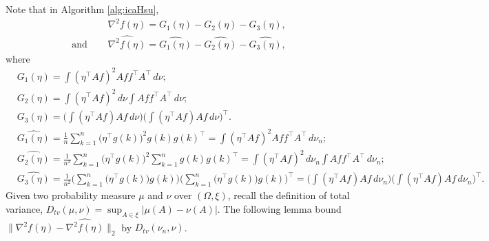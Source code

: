 \documentclass[english]{article} %
\theoremstyle{plain}
\theoremstyle{remark}
\theoremstyle{claim}
\theoremstyle{plain}
\begin{document}
Note that in Algorithm \ref{alg:icaHsu}, 
\begin{align*}
& \nabla^2 f(\eta) = G_1(\eta) - G_2(\eta) -G_3(\eta), \\
\text{and } \quad & \widehat{\nabla^2 f(\eta)} =\widehat{G_1(\eta)} - \widehat{G_2(\eta)} -\widehat{G_3(\eta)},
\end{align*}
where 
\begin{align*}
& G_1(\eta) = \int (\eta^{\top}Af)^2Aff^{\top}A^{\top}\,d\nu; \\
& G_2(\eta) = \int (\eta^{\top}Af)^2\,d\nu \int Aff^{\top}A^{\top} \,d\nu; \\
& G_3(\eta) = \Big(\int (\eta^{\top}Af)Af\,d\nu\Big)\Big(\int (\eta^{\top}Af)Af\,d\nu\Big)^{\top}. \\
&\widehat{ G_1(\eta)} = \frac1n\sum_{k=1}^{n} \big(\eta^{\top}g(k)\big)^2g(k)g(k)^{\top} = \int (\eta^{\top}Af)^2Aff^{\top}A^{\top}\,d\nu_{n}; \\
& \widehat{G_2(\eta)} = \frac{1}{n^2}\sum_{k=1}^{n} \big(\eta^{\top}g(k)\big)^2 \sum_{k=1}^{n}g(k)g(k)^{\top} = \int (\eta^{\top}Af)^2\,d\nu_{n} \int Aff^{\top}A^{\top} \,d\nu_{n}; \\
& \widehat{G_3(\eta)} = \frac{1}{n^2}\Big(\sum_{k=1}^{n} \big(\eta^{\top}g(k)\big)g(k)\Big) \Big(\sum_{k=1}^{n} \big(\eta^{\top}g(k)\big)g(k)\Big)^{\top} = \Big(\int (\eta^{\top}Af)Af\,d\nu_{n}\Big)\Big(\int (\eta^{\top}Af)Af\,d\nu_{n}\Big)^{\top}.
\end{align*}
Given two probability measure $\mu$ and $\nu$ over $(\Omega , \xi)$, recall the definition of total variance, $D_{tv}(\mu, \nu) = \sup_{A\in\xi} |\mu(A) - \nu(A)|$. 
The following lemma bound $\|\nabla^2 f(\eta) - \widehat{\nabla^2 f(\eta)} \|_2$ by $D_{tv}(\nu_n , \nu)$.
\end{document}
